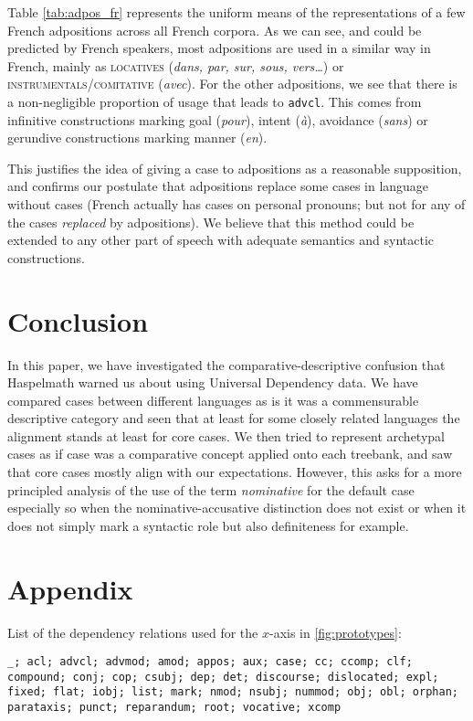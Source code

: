 \documentclass[11pt]{article}
\begin{document}
Table \ref{tab:adpos_fr} represents the uniform means of the representations of a few French adpositions across all French corpora.
As we can see, and could be predicted by French speakers, most adpositions are used in a similar way in French, mainly as \textsc{locatives} (\textsl{dans, par, sur, sous, vers\ldots}) or \textsc{instrumentals/comitative} (\textsl{avec}).
For the other adpositions, we see that there is a non-negligible proportion of usage that leads to \texttt{advcl}.
This comes from infinitive constructions marking goal (\textsl{pour}), intent (\textsl{à}), avoidance (\textsl{sans}) or gerundive constructions marking manner (\textsl{en}).%

This justifies the idea of giving a case to adpositions as a reasonable supposition, and confirms our postulate that adpositions replace some cases in language without cases (French actually has cases on personal pronouns; but not for any of the cases \textit{replaced} by adpositions).
We believe that this method could be extended to any other part of speech with adequate semantics and syntactic constructions.


\section{Conclusion}

In this paper, we have investigated the comparative-descriptive confusion that Haspelmath warned us about using Universal Dependency data.
We have compared cases between different languages as is it was a commensurable descriptive category and seen that at least for some closely related languages the alignment stands at least for core cases.
We then tried to represent archetypal cases as if case was a comparative concept applied onto each treebank, and saw that core cases mostly align with our expectations.
However, this asks for a more principled analysis of the use of the term \textit{nominative} for the default case especially so when the nominative-accusative distinction does not exist or when it does not simply mark a syntactic role but also definiteness for example.








\section*{Appendix}

List of the dependency relations used for the $x$-axis in \ref{fig:prototypes}:

\texttt{\_; acl; advcl; advmod; amod; appos; aux; case; cc; ccomp; clf; compound; conj; cop; csubj; dep; det; discourse; dislocated; expl; fixed; flat; iobj; list; mark; nmod; nsubj; nummod; obj; obl; orphan; parataxis; punct; reparandum; root; vocative; xcomp}
\end{document}
